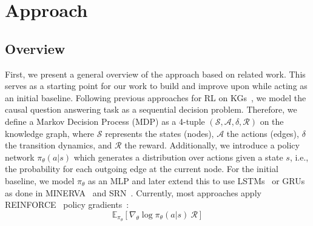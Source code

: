 %
\chapter{Approach}
\label{sec:approach}




\section{Overview}
\label{sec:overview}

First, we present a general overview of the approach based on related work. This serves as a starting point for our work to build and improve upon while acting as an initial baseline. Following previous approaches for RL on KGs~\cite{Das2018Minerva, Qiu2020Stepwise, Kaiser2021Reinforcement}, we model the causal question answering task as a sequential decision problem. Therefore, we define a Markov Decision Process (MDP) as a 4-tuple $(\mathcal{S}, \mathcal{A}, \delta, \mathcal{R})$ on the knowledge graph, where $\mathcal{S}$ represents the states (nodes), $\mathcal{A}$ the actions (edges), $\delta$ the transition dynamics, and $\mathcal{R}$ the reward. Additionally, we introduce a policy network $\pi_{\theta}(a|s)$ which generates a distribution over actions given a state $s$, i.e., the probability for each outgoing edge at the current node.
For the initial baseline, we model $\pi_{\theta}$ as an MLP and later extend this to use LSTMs~\cite{Hochreiter1997LSTM} or GRUs~\cite{Cho2014GRU} as done in MINERVA~\cite{Das2018Minerva} and SRN~\cite{Qiu2020Stepwise}.
Currently, most approaches apply REINFORCE~\cite{Williams1992REINFORCE} policy gradients~\cite{Wan2021GaussianPath}:
\begin{equation}
    \mathbb{E}_{\pi_{\theta}}[\nabla_{\theta} \log \pi_{\theta}(a|s) \ \mathcal{R}]\label{eq:1}
\end{equation}


